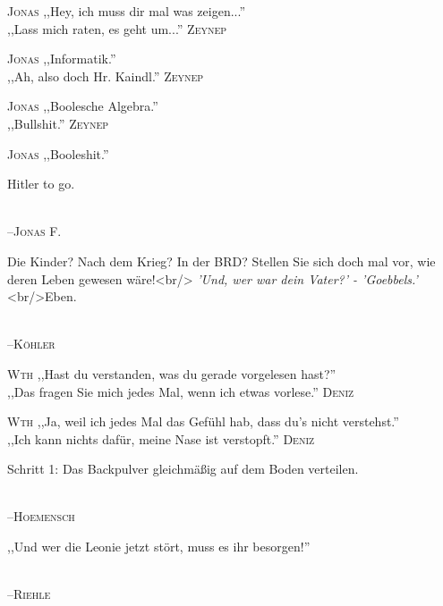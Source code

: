 \vspace{3mm}
\hangindent=0.7cm
\raggedright \textsc{\footnotesize Jonas} ,,Hey, ich muss dir mal was zeigen...''\\
\raggedleft ,,Lass mich raten, es geht um...'' \textsc{\footnotesize Zeynep}\\
\hangindent=0.7cm
\raggedright \textsc{\footnotesize Jonas} ,,Informatik.''\\
\raggedleft ,,Ah, also doch Hr. Kaindl.'' \textsc{\footnotesize Zeynep}\\
\hangindent=0.7cm
\raggedright \textsc{\footnotesize Jonas} ,,Boolesche Algebra.''\\
\raggedleft ,,Bullshit.'' \textsc{\footnotesize Zeynep}\\
\hangindent=0.7cm
\raggedright \textsc{\footnotesize Jonas} ,,Booleshit.''\\

\vspace{3mm}
{\raggedright Hitler to go.}\\
\raggedleft \textsc{\footnotesize --\/Jonas F.}\\

\vspace{3mm}
{\raggedright Die Kinder? Nach dem Krieg? In der BRD? Stellen Sie sich doch mal vor, wie deren Leben gewesen wäre!<br/> \emph{'Und, wer war dein Vater?' -  'Goebbels.'} <br/>Eben.}\\
\raggedleft \textsc{\footnotesize --\/Köhler}\\

\vspace{3mm}
\hangindent=0.7cm
\raggedright \textsc{\footnotesize Wth} ,,Hast du verstanden, was du gerade vorgelesen hast?''\\
\raggedleft ,,Das fragen Sie mich jedes Mal, wenn ich etwas vorlese.'' \textsc{\footnotesize Deniz}\\
\hangindent=0.7cm
\raggedright \textsc{\footnotesize Wth} ,,Ja, weil ich jedes Mal das Gefühl hab, dass du's nicht verstehst.''\\
\raggedleft ,,Ich kann nichts dafür, meine Nase ist verstopft.'' \textsc{\footnotesize Deniz}\\

\vspace{3mm}
{\raggedright Schritt 1: Das Backpulver gleichmäßig auf dem Boden verteilen.}\\
\raggedleft \textsc{\footnotesize --\/Hoemensch}\\

\vspace{3mm}
{\raggedright ,,Und wer die Leonie jetzt stört, muss es ihr besorgen!''}\\
\raggedleft \textsc{\footnotesize --\/Riehle}\\

